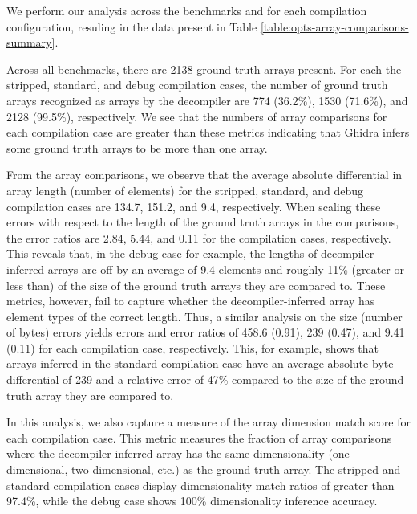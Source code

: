 \documentclass[a4paper,twoside]{article}
\begin{document}
We perform our analysis across the benchmarks and for each compilation configuration, resuling in the data present in Table \ref{table:opts-array-comparisons-summary}.



Across all benchmarks, there are 2138 ground truth arrays present. For each the stripped, standard, and debug compilation cases, the number of ground truth arrays recognized as arrays by the decompiler are 774 (36.2\%), 1530 (71.6\%), and 2128 (99.5\%), respectively. We see that the numbers of array comparisons for each compilation case are greater than these metrics indicating that Ghidra infers some ground truth arrays to be more than one array.

From the array comparisons, we observe that the average absolute differential in array length (number of elements) for the stripped, standard, and debug compilation cases are 134.7, 151.2, and 9.4, respectively. When scaling these errors with respect to the length of the ground truth arrays in the comparisons, the error ratios are 2.84, 5.44, and 0.11 for the compilation cases, respectively. This reveals that, in the debug case for example, the lengths of decompiler-inferred arrays are off by an average of 9.4 elements and roughly 11\% (greater or less than) of the size of the ground truth arrays they are compared to. These metrics, however, fail to capture whether the decompiler-inferred array has element types of the correct length. Thus, a similar analysis on the size (number of bytes) errors yields errors and error ratios of 458.6 (0.91), 239 (0.47), and 9.41 (0.11) for each compilation case, respectively. This, for example, shows that arrays inferred in the standard compilation case have an average absolute byte differential of 239 and a relative error of 47\% compared to the size of the ground truth array they are compared to.

In this analysis, we also capture a measure of the array dimension match score for each compilation case. This metric measures the fraction of array comparisons where the decompiler-inferred array has the same dimensionality (one-dimensional, two-dimensional, etc.) as the ground truth array. The stripped and standard compilation cases display dimensionality match ratios of greater than 97.4\%, while the debug case shows 100\% dimensionality inference accuracy.
\end{document}
